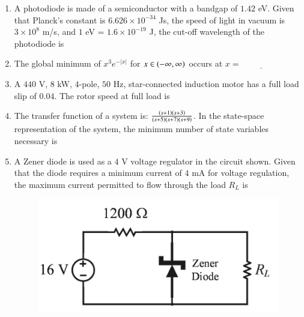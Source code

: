 \documentclass[journal,12pt,onecolumn]{IEEEtran}
\theoremstyle{remark}
\begin{document}
\begin{enumerate}
\hfill{}

\item A photodiode is made of a semiconductor with a bandgap of $1.42$ eV. Given that Planck's constant is $6.626 \times 10^{-34}$ Js, the speed of light in vacuum is $3 \times 10^8$ m/s, and $1$ eV = $1.6 \times 10^{-19}$ J, the cut-off wavelength  of the photodiode is \underline{\hspace{2cm}} 

\hfill{}

\item The global minimum of $x^3 e^{-|x|}$ for $x \in \left(-\infty, \infty\right)$ occurs at $x = \underline{\hspace{2cm}}$ 

\hfill{}

\item A $440$ V, $8$ kW, $4$-pole, $50$ Hz, star-connected induction motor has a full load slip of $0.04$. The rotor speed  at full load is \underline{\hspace{2cm}} 

\hfill{}

\item The transfer function of a system is: $\frac{\left(s+1\right)\left(s+3\right)}{\left(s+5\right)\left(s+7\right)\left(s+9\right)}$. In the state-space representation of the system, the minimum number of state variables  necessary is \underline{\hspace{2cm}}

\hfill{}

\item A Zener diode is used as a $4$ V voltage regulator in the circuit shown. Given that the diode requires a minimum current of $4$ mA for voltage regulation, the maximum current  permitted to flow through the load $R_L$ is \underline{\hspace{2cm}} 

\hfill{}
\begin{figure}[H]
\includegraphics[width = 0.5\columnwidth]{q31}
\caption*{}
\label{q31}
\end{figure}


\end{enumerate}
\end{document}
